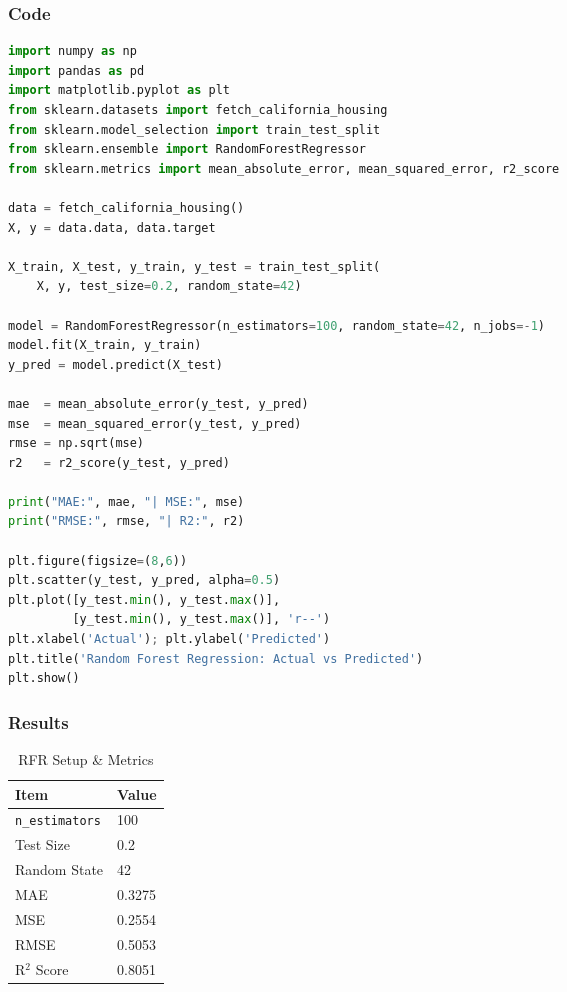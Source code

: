 \documentclass[a4paper,10pt]{article}
\begin{document}
\subsubsection{Code}
\begin{lstlisting}[language=Python, caption={Random Forest Regression Implementation}]
import numpy as np
import pandas as pd
import matplotlib.pyplot as plt
from sklearn.datasets import fetch_california_housing
from sklearn.model_selection import train_test_split
from sklearn.ensemble import RandomForestRegressor
from sklearn.metrics import mean_absolute_error, mean_squared_error, r2_score

data = fetch_california_housing()
X, y = data.data, data.target

X_train, X_test, y_train, y_test = train_test_split(
    X, y, test_size=0.2, random_state=42)

model = RandomForestRegressor(n_estimators=100, random_state=42, n_jobs=-1)
model.fit(X_train, y_train)
y_pred = model.predict(X_test)

mae  = mean_absolute_error(y_test, y_pred)
mse  = mean_squared_error(y_test, y_pred)
rmse = np.sqrt(mse)
r2   = r2_score(y_test, y_pred)

print("MAE:", mae, "| MSE:", mse)
print("RMSE:", rmse, "| R2:", r2)

plt.figure(figsize=(8,6))
plt.scatter(y_test, y_pred, alpha=0.5)
plt.plot([y_test.min(), y_test.max()],
         [y_test.min(), y_test.max()], 'r--')
plt.xlabel('Actual'); plt.ylabel('Predicted')
plt.title('Random Forest Regression: Actual vs Predicted')
plt.show()
\end{lstlisting}

\subsubsection{Results}
\begin{table}[H]
\centering
\caption{RFR Setup \& Metrics}
\begin{tabular}{ll}
\toprule
\textbf{Item} & \textbf{Value} \\
\midrule
\texttt{n\_estimators} & 100 \\
Test Size & 0.2 \\
Random State & 42 \\
MAE & 0.3275 \\
MSE & 0.2554 \\
RMSE & 0.5053 \\
R\(^2\) Score & 0.8051 \\
\bottomrule
\end{tabular}
\end{table}
\end{document}
